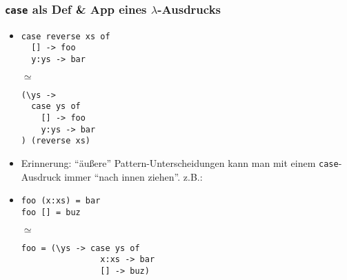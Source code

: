 \documentclass{beamer}
\begin{document}
\begin{frame}[fragile]
  \frametitle{\texttt{case} als Def \& App eines \(\lambda\)-Ausdrucks}
  \begin{itemize}
  \item
    \begin{minipage}{.4\linewidth}
\begin{Verbatim}
case reverse xs of 
  [] -> foo
  y:ys -> bar
\end{Verbatim}
    \end{minipage}
    \(\simeq\)
    \begin{minipage}{.4\linewidth}
\begin{Verbatim}
(\ys -> 
  case ys of 
    [] -> foo
    y:ys -> bar
) (reverse xs)
\end{Verbatim}
    \end{minipage}
  \item Erinnerung: \enquote{äußere} Pattern-Unterscheidungen kann man mit einem \texttt{case}-Ausdruck immer \enquote{nach innen ziehen}. z.B.:
  \item
    \begin{minipage}{.4\linewidth}
\begin{Verbatim}
foo (x:xs) = bar
foo [] = buz
\end{Verbatim}
    \end{minipage}
    \(\simeq\)
    \begin{minipage}{.4\linewidth}
\begin{Verbatim}
foo = (\ys -> case ys of 
                x:xs -> bar
                [] -> buz)
\end{Verbatim}
    \end{minipage}
  \end{itemize}
\end{frame}
\end{document}
